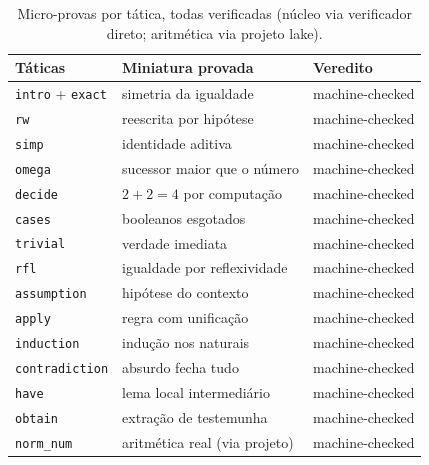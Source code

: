 \begin{table}[htbp]
\fontsize{10}{12}\selectfont\SingleSpacing
\centering
\caption{Micro-provas por tática, todas verificadas (núcleo via verificador direto; aritmética via projeto lake).}
\label{tab:microprovas-ap}
\begin{tabularx}{\textwidth}{lXX}
\toprule
Táticas & Miniatura provada & Veredito \\
\midrule
\texttt{intro} + \texttt{exact} & simetria da igualdade & machine-checked \\
\texttt{rw} & reescrita por hipótese & machine-checked \\
\texttt{simp} & identidade aditiva & machine-checked \\
\texttt{omega} & sucessor maior que o número & machine-checked \\
\texttt{decide} & $2+2=4$ por computação & machine-checked \\
\texttt{cases} & booleanos esgotados & machine-checked \\
\texttt{trivial} & verdade imediata & machine-checked \\
\texttt{rfl} & igualdade por reflexividade & machine-checked \\
\texttt{assumption} & hipótese do contexto & machine-checked \\
\texttt{apply} & regra com unificação & machine-checked \\
\texttt{induction} & indução nos naturais & machine-checked \\
\texttt{contradiction} & absurdo fecha tudo & machine-checked \\
\texttt{have} & lema local intermediário & machine-checked \\
\texttt{obtain} & extração de testemunha & machine-checked \\
\texttt{norm\_num} & aritmética real (via projeto) & machine-checked \\
\bottomrule
\end{tabularx}
\end{table}
